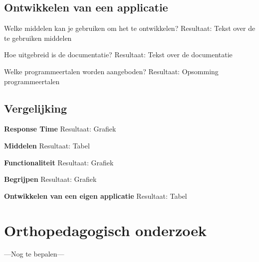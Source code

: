\subsection{Ontwikkelen van een applicatie}
\label{sec:ontwikkelen van een applicatie}
Welke middelen kan je gebruiken om het te ontwikkelen?
Resultaat: Tekst over de te gebruiken middelen

Hoe uitgebreid is de documentatie?
Resultaat: Tekst over de documentatie

Welke programmeertalen worden aangeboden?
Resultaat: Opsomming programmeertalen

\subsection{Vergelijking}
\label{sec:vergelijking tussen de onderzochte bedrijven}
\textbf{Response Time}
Resultaat: Grafiek

\textbf{Middelen}
Resultaat: Tabel

\textbf{Functionaliteit}
Resultaat: Grafiek

\textbf{Begrijpen}
Resultaat: Grafiek

\textbf{Ontwikkelen van een eigen applicatie}
Resultaat: Tabel

\section{Orthopedagogisch onderzoek}
---Nog te bepalen---

\lipsum[21-25]

